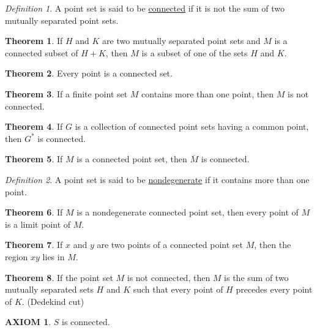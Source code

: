 \documentclass[12pt, oneside, letter] {amsart}
\theoremstyle {definition}
\newtheorem {thm} {Theorem}
\newtheorem {ax} {AXIOM}
\theoremstyle {remark}
\newtheorem* {defn} {Definition}
\begin{document}
\begin{defn}
  A point set is said to be \underline {connected} if it is not the
  sum of two mutually separated point sets.
\end{defn}

\begin{thm}
  If $H$ and $K$ are two mutually separated point sets and $M$ is a
  connected subset of $H + K$, then $M$ is a subset of one of the sets
  $H$ and $K$.
\end{thm}

\begin{thm}
  Every point is a connected set.
\end{thm}

\begin{thm}
  If a finite point set $M$ contains more than one point, then $M$ is
  not connected.
\end{thm}

\begin{thm}
  If $G$ is a collection of connected point sets having a common
  point, then $G^*$ is connected.
\end{thm}

\begin{thm}
  If $M$ is a connected point set, then $\overline M$ is connected.
\end{thm}

\begin{defn}
  A point set is said to be \underline {nondegenerate} if it contains
  more than one point.
\end{defn}

\begin{thm}
  If $M$ is a nondegenerate connected point set, then every point of
  $M$ is a limit point of $M$.
\end{thm}

\begin{thm}
  If $x$ and $y$ are two points of a connected point set $M$, then the
  region $xy$ lies in $M$.
\end{thm}

\begin{thm}
  If the point set $M$ is not connected, then $M$ is the sum of two
  mutually separated sets $H$ and $K$ such that every point of $H$
  precedes every point of $K$. (Dedekind cut)
\end{thm}

\begin{ax}
  $S$ is connected.
\end{ax}
\end{document}
